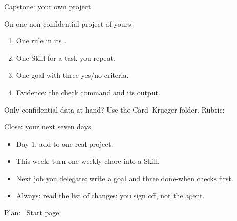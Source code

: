 \begin{frame}{Capstone: your own project}
  \par\vspace{0.3em}
  On one non-confidential project of yours:
  \begin{enumerate}
    \item One rule in its .
    \item One Skill for a task you repeat.
    \item One goal with three yes/no criteria.
    \item Evidence: the check command and its output.
  \end{enumerate}
  {\small Only confidential data at hand? Use the Card--Krueger folder. Rubric: }
\end{frame}

\begin{frame}{Close: your next seven days}
  \par\vspace{0.3em}
  \begin{itemize}
    \item Day 1: add  to one real project.
    \item This week: turn one weekly chore into a Skill.
    \item Next job you delegate: write a goal and three done-when checks first.
    \item Always: read the list of changes; you sign off, not the agent.
  \end{itemize}
  \vspace{0.4em}
  {\small Plan:  \textperiodcentered\ Start page: }
\end{frame}
